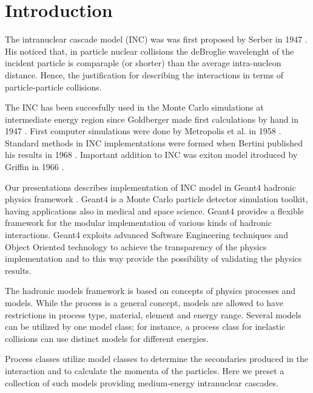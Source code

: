 \section{Introduction}

The intranuclear cascade model (INC) was was first proposed by Serber in 1947 \cite{serber47}.  
His noticed that, in particle nuclear collisions the deBroglie wavelenght of the incident particle is 
comparaple (or shorter) than the average intra-nucleon distance.
Hence, the justification for describing the interactions in terms of particle-particle  collisions.


The INC has been succesfully used in the Monte Carlo simulations at intermediate energy region 
since Goldberger made first calculations by hand in 1947 \cite{goldberger48}. 
First computer simulations were done by Metropolis et al. in 1958 \cite{metropolis58}. 
Standard methods in INC implementations were formed when Bertini published his results in 1968 \cite{bertini68}.
Important addition to INC was exiton model itroduced by Griffin in 1966 \cite{griffin66}. 


Our presentations describes implementation of INC model in {\sc Geant4} hadronic physics framework \cite{geant4collaboration03}.
Geant4 is a Monte Carlo particle detector simulation toolkit, having applications also in  medical and space
science. 
Geant4 provides a flexible framework for the modular implementation of
various kinds of hadronic interactions. 
Geant4 exploits advanced Software Engineering techniques and Object
Oriented technology to achieve the transparency of the physics
implementation and to this way provide the possibility of validating the
physics results. 

The hadronic models framework is based on concepts of physics
processes and models. While the process is a general concept, models
are allowed to have restrictions in process type, material, element
and energy range.  Several models can be utilized by one model class; for instance, a
process class for inelastic collisions can use distinct models for different energies.


Process classes utilize model classes to determine the
secondaries produced in the interaction and to calculate the momenta
of the particles. Here we preset a collection of such models providing medium-energy
intranuclear cascades.






